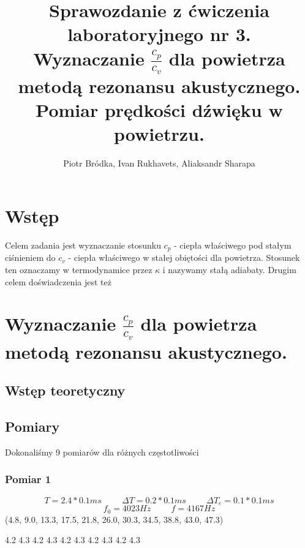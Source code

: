 \documentclass[12pt,a4paper]{article}
\begin{document}
\begin{titlepage}


\title{%
Sprawozdanie z ćwiczenia laboratoryjnego nr 3.\\
\large  Wyznaczanie $\frac{c_p}{c_v}$ dla powietrza metodą rezonansu akustycznego. Pomiar prędkości dźwięku w powietrzu.}

\author{Piotr Bródka, Ivan Rukhavets, Aliaksandr Sharapa}


\maketitle
\end{titlepage}

\section{Wstęp}
Celem zadania jest wyznaczanie stosunku $c_p$ - ciepła właściwego pod stałym ciśnieniem do $c_v$ - ciepła właściwego w stałej obiętości dla powietrza. Stosunek ten oznaczamy w termodynamice przez $\kappa$ i nazywamy stałą adiabaty.
Drugim celem doświadczenia jest też


\section{Wyznaczanie $\frac{c_p}{c_v}$ dla powietrza metodą rezonansu akustycznego.} 

\subsection{Wstęp teoretyczny}

\subsection{Pomiary}
Dokonaliśmy 9 pomiarów dla różnych częstotliwości

\subsubsection{Pomiar 1}
$$
T = 2.4*0.1ms \hspace{1cm} \Delta T = 0.2*0.1ms \hspace{1cm} \Delta T_e = 0.1*0.1ms 
$$
$$
f_0 = 4023Hz \hspace{1cm} f=4167Hz
$$
(4.8, 9.0, 13.3, 17.5, 21.8, 26.0, 30.3, 34.5, 38.8, 43.0, 47.3)

4.2 4.3 4.2 4.3 4.2 4.3 4.2 4.3 4.2 4.3
\end{document}
